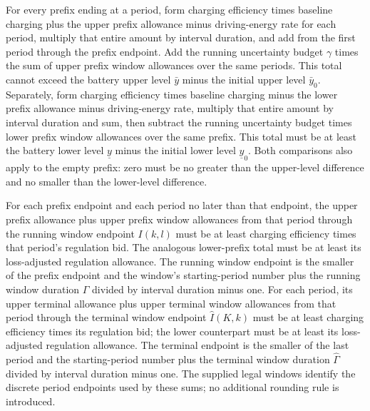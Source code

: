 \documentclass[10pt]{article}
\begin{document}
For every prefix ending at a period, form charging efficiency times baseline charging plus the upper prefix allowance minus driving-energy rate for each period, multiply that entire amount by interval duration, and add from the first period through the prefix endpoint. Add the running uncertainty budget $\gamma$ times the sum of upper prefix window allowances over the same periods. This total cannot exceed the battery upper level $\bar y$ minus the initial upper level $\bar y_0$. Separately, form charging efficiency times baseline charging minus the lower prefix allowance minus driving-energy rate, multiply that entire amount by interval duration and sum, then subtract the running uncertainty budget times lower prefix window allowances over the same prefix. This total must be at least the battery lower level $\underline y$ minus the initial lower level $\underline y_0$. Both comparisons also apply to the empty prefix: zero must be no greater than the upper-level difference and no smaller than the lower-level difference.

For each prefix endpoint and each period no later than that endpoint, the upper prefix allowance plus upper prefix window allowances from that period through the running window endpoint $I(k,l)$ must be at least charging efficiency times that period's regulation bid. The analogous lower-prefix total must be at least its loss-adjusted regulation allowance. The running window endpoint is the smaller of the prefix endpoint and the window's starting-period number plus the running window duration $\Gamma$ divided by interval duration minus one. For each period, its upper terminal allowance plus upper terminal window allowances from that period through the terminal window endpoint $\hat I(K,k)$ must be at least charging efficiency times its regulation bid; the lower counterpart must be at least its loss-adjusted regulation allowance. The terminal endpoint is the smaller of the last period and the starting-period number plus the terminal window duration $\hat\Gamma$ divided by interval duration minus one. The supplied legal windows identify the discrete period endpoints used by these sums; no additional rounding rule is introduced.
\end{document}
